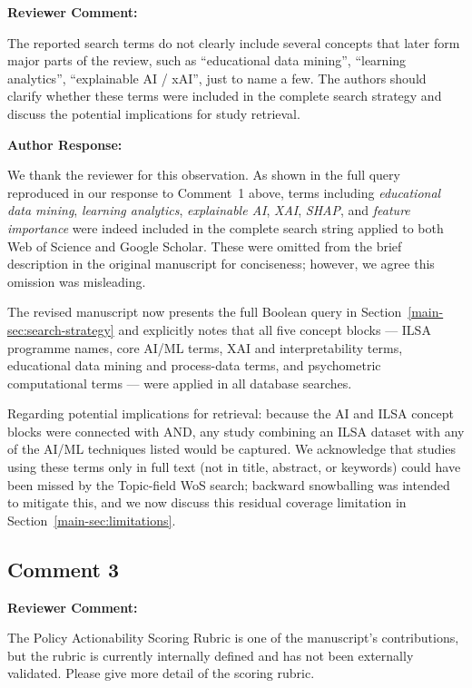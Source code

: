 \documentclass[12pt, a4paper]{article}
\newcommand{\R}[1]{Section~\ref{main-#1}}
\newenvironment{reviewercomment}{%
  \begin{mdframed}[linecolor=reviewercolor, linewidth=1.5pt,
    backgroundcolor=reviewercolor!6, innertopmargin=8pt, innerbottommargin=8pt]
  \color{reviewercolor}\textbf{Reviewer Comment:}\normalcolor\par\smallskip
}{%
  \end{mdframed}\medskip
}
\newenvironment{authorresponse}{%
  \begin{mdframed}[linecolor=authorcolor, linewidth=1pt,
    backgroundcolor=authorcolor!5, innertopmargin=8pt, innerbottommargin=8pt]
  \color{authorcolor}\textbf{Author Response:}\normalcolor\par\smallskip
}{%
  \end{mdframed}\bigskip
}
\begin{document}
\begin{reviewercomment}
The reported search terms do not clearly include several concepts that later
form major parts of the review, such as ``educational data mining'',
``learning analytics'', ``explainable AI / xAI'', just to name a few.
The authors should clarify whether these terms were included in the complete
search strategy and discuss the potential implications for study retrieval.
\end{reviewercomment}

\begin{authorresponse}
We thank the reviewer for this observation. As shown in the full query
reproduced in our response to Comment~1 above, terms including
\textit{educational data mining}, \textit{learning analytics},
\textit{explainable AI}, \textit{XAI}, \textit{SHAP}, and
\textit{feature importance} were indeed included in the complete search
string applied to both Web of Science and Google Scholar. These were
omitted from the brief description in the original manuscript for
conciseness; however, we agree this omission was misleading.

The revised manuscript now presents the full Boolean query in
\R{sec:search-strategy} and explicitly notes that all five concept
blocks --- ILSA programme names, core AI/ML terms, XAI and interpretability
terms, educational data mining and process-data terms, and psychometric
computational terms --- were applied in all database searches.

Regarding potential implications for retrieval: because the AI and ILSA
concept blocks were connected with AND, any study combining an ILSA dataset
with any of the AI/ML techniques listed would be captured. We acknowledge
that studies using these terms only in full text (not in title, abstract,
or keywords) could have been missed by the Topic-field WoS search; backward
snowballing was intended to mitigate this, and we now discuss this residual
coverage limitation in \R{sec:limitations}.
\end{authorresponse}

\subsection*{Comment 3}

\begin{reviewercomment}
The Policy Actionability Scoring Rubric is one of the manuscript's
contributions, but the rubric is currently internally defined and has not
been externally validated. Please give more detail of the scoring rubric.
\end{reviewercomment}
\end{document}
